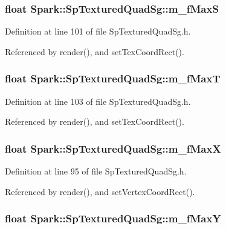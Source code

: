 \subsubsection{\setlength{\rightskip}{0pt plus 5cm}float {\bf Spark::Sp\-Textured\-Quad\-Sg::m\_\-f\-Max\-S}\hspace{0.3cm}{\tt  [protected]}}\label{classSpark_1_1SpTexturedQuadSg_p6}


Definition at line 101 of file Sp\-Textured\-Quad\-Sg.h.

Referenced by render(), and set\-Tex\-Coord\-Rect().
\subsubsection{\setlength{\rightskip}{0pt plus 5cm}float {\bf Spark::Sp\-Textured\-Quad\-Sg::m\_\-f\-Max\-T}\hspace{0.3cm}{\tt  [protected]}}\label{classSpark_1_1SpTexturedQuadSg_p8}


Definition at line 103 of file Sp\-Textured\-Quad\-Sg.h.

Referenced by render(), and set\-Tex\-Coord\-Rect().
\subsubsection{\setlength{\rightskip}{0pt plus 5cm}float {\bf Spark::Sp\-Textured\-Quad\-Sg::m\_\-f\-Max\-X}\hspace{0.3cm}{\tt  [protected]}}\label{classSpark_1_1SpTexturedQuadSg_p2}


Definition at line 95 of file Sp\-Textured\-Quad\-Sg.h.

Referenced by render(), and set\-Vertex\-Coord\-Rect().
\subsubsection{\setlength{\rightskip}{0pt plus 5cm}float {\bf Spark::Sp\-Textured\-Quad\-Sg::m\_\-f\-Max\-Y}\hspace{0.3cm}{\tt  [protected]}}\label{classSpark_1_1SpTexturedQuadSg_p3}



